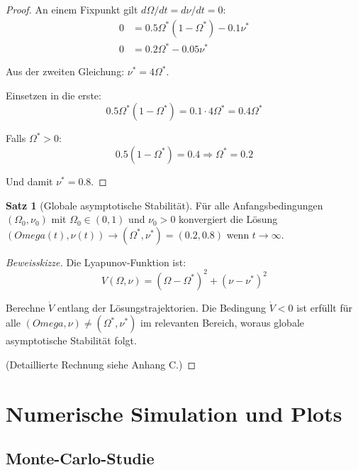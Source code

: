 \documentclass[a4paper, 12pt, twoside, openright]{report}
\theoremstyle{definition}
\theoremstyle{definition}
\newtheorem{satz}{Satz}[chapter]
\begin{document}
\begin{proof}
    An einem Fixpunkt gilt $d\Omega/dt = d\nu/dt = 0$:
    \begin{align}
        0 &= 0.5\Omega^*(1-\Omega^*) - 0.1\nu^* \\
        0 &= 0.2\Omega^* - 0.05\nu^*
    \end{align}
    
    Aus der zweiten Gleichung: $\nu^* = 4\Omega^*$.
    
    Einsetzen in die erste:
    \begin{equation}
        0.5\Omega^*(1-\Omega^*) = 0.1 \cdot 4\Omega^* = 0.4\Omega^*
    \end{equation}
    
    Falls $\Omega^* > 0$:
    \begin{equation}
        0.5(1-\Omega^*) = 0.4 \Rightarrow \Omega^* = 0.2
    \end{equation}
    
    Und damit $\nu^* = 0.8$.
\end{proof}

\begin{satz}[Globale asymptotische Stabilität]
    Für alle Anfangsbedingungen $(\Omega_0, \nu_0)$ mit $\Omega_0 \in (0,1)$ und $\nu_0 > 0$ konvergiert die Lösung $(Omega(t), \nu(t)) \to (\Omega^*, \nu^*) = (0.2, 0.8)$ wenn $t \to \infty$.
\end{satz}

\begin{proof}[Beweisskizze]
    Die Lyapunov-Funktion ist:
    \begin{equation}
        V(\Omega, \nu) = (\Omega - \Omega^*)^2 + (\nu - \nu^*)^2
    \end{equation}
    
    Berechne $\dot{V}$ entlang der Lösungstrajektorien. Die Bedingung $\dot{V} < 0$ ist erfüllt für alle $(Omega, \nu) \neq (\Omega^*, \nu^*)$ im relevanten Bereich, woraus globale asymptotische Stabilität folgt.
    
    (Detaillierte Rechnung siehe Anhang C.)
\end{proof}

\section{Numerische Simulation und Plots}

\subsection{Monte-Carlo-Studie}
\end{document}

